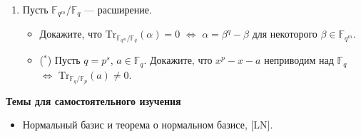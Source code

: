 \documentclass[a4paper, 11pt]{article}
\begin{document}
\begin{enumerate}[topsep=0pt]
    \item Пусть $\mathbb{F}_{q^m}/\mathbb{F}_q$ --- расширение.
    \begin{itemize}[noitemsep,topsep=0pt]
        \item Докажите, что $\mathrm{Tr}_{\mathbb{F}_{q^m}/\mathbb{F}_q}(\alpha)=0$ $\Leftrightarrow$ $\alpha=\beta^q-\beta$ для некоторого $\beta\in\mathbb{F}_{q^m}$.
        \item ($^*$) Пусть $q=p^s$, $a\in\mathbb{F}_q$. Докажите, что $x^p-x-a$ неприводим над $\mathbb{F}_q$ $\Leftrightarrow$ $\mathrm{Tr}_{\mathbb{F}_q/\mathbb{F}_p}(a)\neq 0$.
    \end{itemize} %
\end{enumerate}


\noindent\textbf{Темы для самостоятельного изучения}
\begin{itemize}[topsep=0pt]
    \item Нормальный базис и теорема о нормальном базисе, [LN].
\end{itemize}    
\end{document}
